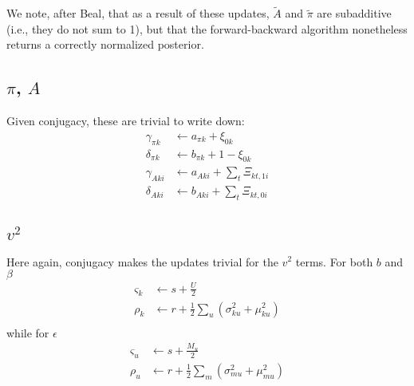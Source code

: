 \documentclass[11pt]{article}
\begin{document}
We note, after Beal, that as a result of these updates, $\tilde{A}$ and $\tilde{\pi}$ are subadditive (i.e., they do not sum to 1), but that the forward-backward algorithm nonetheless returns a correctly normalized posterior.

\subsection{$\pi$, $A$}
Given conjugacy, these are trivial to write down:
\begin{align}
    \gamma_{\pi k} &\leftarrow a_{\pi k} + \xi_{0k} \\
    \delta_{\pi k} &\leftarrow b_{\pi k} + 1 - \xi_{0k} \\
    \gamma_{A ki} &\leftarrow a_{A ki} + \sum_t \Xi_{kt, 1i} \\
    \delta_{A ki} &\leftarrow b_{A ki} + \sum_t \Xi_{kt, 0i}
\end{align}

\subsection{$v^2$}
Here again, conjugacy makes the updates trivial for the $v^2$ terms. For both $b$ and $\beta$
\begin{align}
    \varsigma_k &\leftarrow s + \frac{U}{2} \\
    \rho_k &\leftarrow r + \frac{1}{2}\sum_u (\sigma^2_{ku} + \mu^2_{ku}) \\
\end{align}
while for $\epsilon$
\begin{align}
    \varsigma_u &\leftarrow s + \frac{M_u}{2} \\
    \rho_u &\leftarrow r + \frac{1}{2} \sum_m (\sigma^2_{mu} + \mu^2_{mu})
\end{align}
\end{document}
